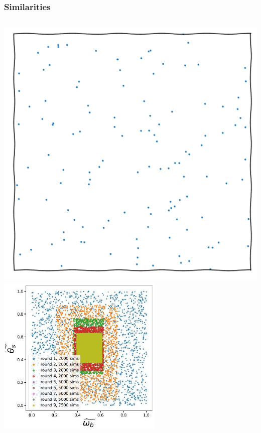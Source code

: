 \documentclass[aspectratio=169]{beamer}
\begin{document}
\begin{frame}
    \frametitle{Similarities}
    \begin{columns}
        \includegraphics[width=\textwidth,page=15]{figures/himmelblau}%
        \includegraphics[width=\textwidth]{figures/tmnre.pdf}
    \end{columns}
\end{frame}
\end{document}
